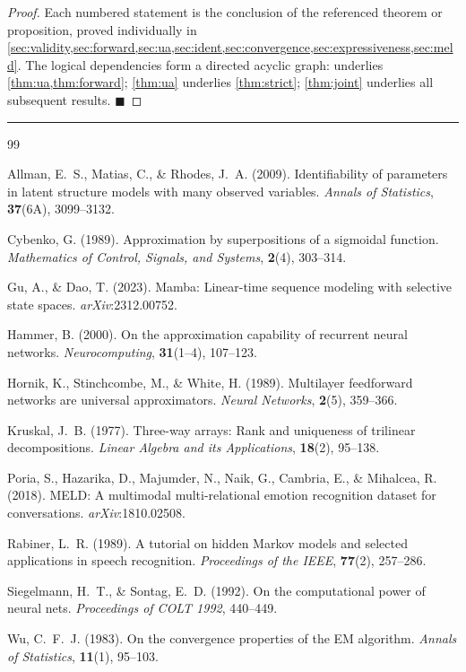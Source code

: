 \documentclass[11pt, a4paper]{article}
\newcommand{\QED}{\hfill$\blacksquare$}
\begin{document}
\begin{proof}
Each numbered statement is the conclusion of the referenced theorem or
proposition, proved individually in \cref{sec:validity,sec:forward,sec:ua,sec:ident,sec:convergence,sec:expressiveness,sec:meld}.
The logical dependencies form a directed acyclic graph:
 underlies \cref{thm:ua,thm:forward};
\cref{thm:ua} underlies \cref{thm:strict};
\cref{thm:joint} underlies all subsequent results.  \QED
\end{proof}

\bigskip
\textcolor{RuleLine}{\rule{\linewidth}{0.4pt}}
\begin{thebibliography}{99}
\small

Allman, E.~S., Matias, C., \& Rhodes, J.~A. (2009).
Identifiability of parameters in latent structure models with many observed
variables.
\textit{Annals of Statistics}, \textbf{37}(6A), 3099--3132.

Cybenko, G. (1989).
Approximation by superpositions of a sigmoidal function.
\textit{Mathematics of Control, Signals, and Systems}, \textbf{2}(4),
303--314.

Gu, A., \& Dao, T. (2023).
Mamba: Linear-time sequence modeling with selective state spaces.
\textit{arXiv}:2312.00752.

Hammer, B. (2000).
On the approximation capability of recurrent neural networks.
\textit{Neurocomputing}, \textbf{31}(1--4), 107--123.

Hornik, K., Stinchcombe, M., \& White, H. (1989).
Multilayer feedforward networks are universal approximators.
\textit{Neural Networks}, \textbf{2}(5), 359--366.

Kruskal, J.~B. (1977).
Three-way arrays: Rank and uniqueness of trilinear decompositions.
\textit{Linear Algebra and its Applications}, \textbf{18}(2), 95--138.

Poria, S., Hazarika, D., Majumder, N., Naik, G., Cambria, E., \& Mihalcea,
R. (2018).
MELD: A multimodal multi-relational emotion recognition dataset for
conversations.
\textit{arXiv}:1810.02508.

Rabiner, L.~R. (1989).
A tutorial on hidden Markov models and selected applications in speech
recognition.
\textit{Proceedings of the IEEE}, \textbf{77}(2), 257--286.

Siegelmann, H.~T., \& Sontag, E.~D. (1992).
On the computational power of neural nets.
\textit{Proceedings of COLT 1992}, 440--449.

Wu, C.~F.~J. (1983).
On the convergence properties of the EM algorithm.
\textit{Annals of Statistics}, \textbf{11}(1), 95--103.

\end{thebibliography}
\end{document}
